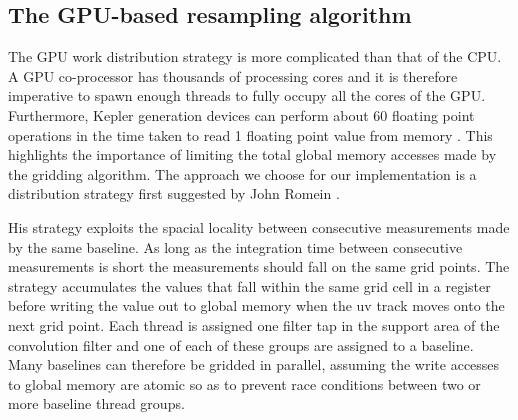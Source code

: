 \subsection{The GPU-based resampling algorithm}
The GPU work distribution strategy is more complicated than that of the CPU. A GPU co-processor has thousands of processing cores and it is therefore imperative to spawn enough threads to fully
occupy all the cores of the GPU. Furthermore, Kepler generation devices can perform about 60 floating point operations in the time taken to read 1 floating point value from memory \cite{kepler}. This highlights the importance of 
limiting the total global memory accesses made by the gridding algorithm. The approach we choose for our implementation is a distribution strategy first
suggested by John Romein \cite{romein2012efficient}.

His strategy exploits the spacial locality between consecutive measurements made by the same baseline. As long as the integration time
between consecutive measurements is short the measurements should fall on the same grid points. The strategy accumulates the values that fall 
within the same grid cell in a register before writing the value out to global memory when the uv track moves onto the next grid point.
Each thread is assigned one filter tap in the support area of the convolution filter and one of each of these groups are assigned to a baseline.
Many baselines can therefore be gridded in parallel, assuming the write accesses to global memory are atomic so as to prevent race conditions
between two or more baseline thread groups.

